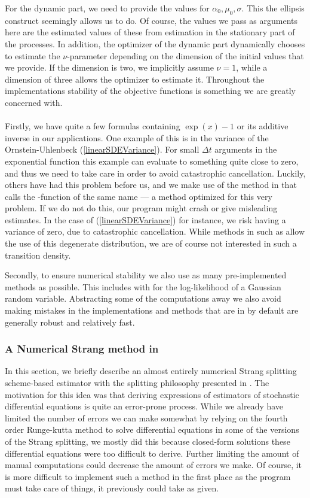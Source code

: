 For the dynamic part, we need to provide the values for $\alpha_0, \mu_0, \sigma$. This the ellipsis construct seemingly allows us to do. Of course, the values we pass as arguments here are the estimated values of these from estimation in the stationary part of the processes. In addition, the optimizer of the dynamic part dynamically chooses to estimate the $\nu$-parameter depending on the dimension of the initial values that we provide. If the dimension is two, we implicitly assume $\nu = 1$, while a dimension of three allows the optimizer to estimate it. Throughout the implementations stability of the objective functions is something we are greatly concerned with. \\\\
Firstly, we have quite a few formulas containing $\exp\left(x\right) - 1$ or its additive inverse in our applications. One example of this is in the variance of the Ornstein-Uhlenbeck (\ref{linearSDEVariance}). For small $\Delta t$ arguments in the exponential function this example can evaluate to something quite close to zero, and thus we need to take care in order to avoid catastrophic cancellation. Luckily, others have had this problem before us, and we make use of the  method in  that calls the -function of the same name — a method optimized for this very problem. \cite{cppreference_expm1} If we do not do this, our program might crash or give misleading estimates. In the case of (\ref{linearSDEVariance}) for instance, we risk having a variance of zero, due to catastrophic cancellation. While methods in  such as  allow the use of this degenerate distribution, we are of course not interested in such a transition density.

Secondly, to ensure numerical stability we also use as many pre-implemented methods as possible. This includes  with  for the log-likelihood of a Gaussian random variable. Abstracting some of the computations away we also avoid making mistakes in the implementations and methods that are in  by default are generally robust and relatively fast.
\subsubsection{A Numerical Strang method in }\label{subsection:NumericalStrangSplitting}
In this section, we briefly describe an almost entirely numerical Strang splitting scheme-based estimator with the splitting philosophy presented in \cite{SplittingSchemes}. The motivation for this idea was that deriving expressions of estimators of stochastic differential equations is quite an error-prone process. While we already have limited the number of errors we can make somewhat by relying on the fourth order Runge-kutta method to solve differential equations in some of the versions of the Strang splitting, we mostly did this because closed-form solutions these differential equations were too difficult to derive. Further limiting the amount of manual computations could decrease the amount of errors we make. Of course, it is more difficult to implement such a method in the first place as the program must take care of things, it previously could take as given.

